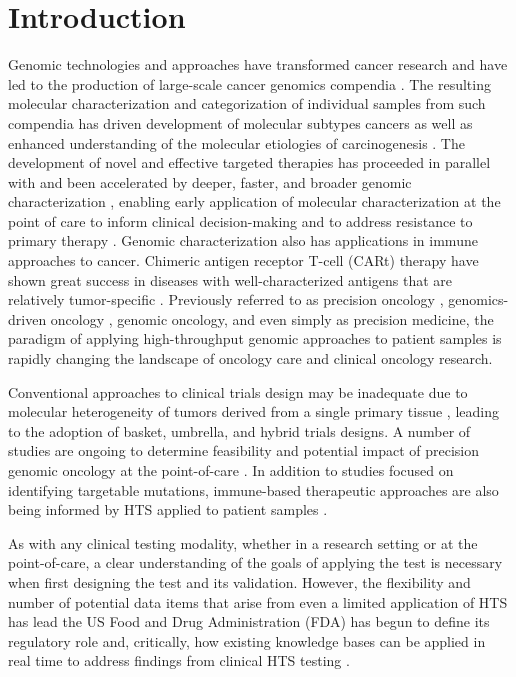 \documentclass[10pt,letterpaper]{article}
\begin{document}
\section{Introduction}
Genomic technologies and approaches have transformed
cancer research and have led to the production of large-scale cancer
genomics compendia
\cite{noauthor_undated-vx,Cancer_Genome_Atlas_Research_Network2013-gt}. The
resulting molecular characterization and categorization of individual
samples from such compendia has driven development of molecular
subtypes cancers as well as enhanced understanding of the molecular
etiologies of carcinogenesis
\cite{Cancer_Genome_Atlas_Network2012-nz,Cancer_Genome_Atlas_Research_Network2015-gd,noauthor_2008-wg}. The
development of novel and effective targeted therapies has proceeded in
parallel with and been accelerated by deeper, faster, and broader
genomic characterization \cite{Blumenthal2016-fb}, enabling early
application of molecular characterization at the point of care to
inform clinical decision-making
\cite{Flaherty2012-dq,Shaw2013-wl,Maemondo2010-dj,Druker2006-qk} and
to address resistance to primary therapy \cite{Ai2014-nf}. Genomic
characterization also has applications in immune approaches to
cancer. Chimeric antigen receptor T-cell (CARt) therapy have shown
great success in diseases with well-characterized antigens that are
relatively tumor-specific \cite{Grupp2013-nd}. Previously referred to
as precision oncology \cite{Sohal2015-bi}, genomics-driven oncology
\cite{Garraway2013-zo}, genomic oncology, and even simply as precision
medicine, the paradigm of applying high-throughput genomic approaches
to patient samples is rapidly changing the landscape of oncology care
and clinical oncology research.

Conventional approaches to clinical trials design may be inadequate
due to molecular heterogeneity of tumors derived from a single primary
tissue \cite{Simon2016-ik}, leading to the adoption of basket,
umbrella, and hybrid trials designs. A number of studies are ongoing
to determine feasibility and potential impact of precision genomic
oncology at the point-of-care
\cite{Cheng2015-wh,noauthor_undated-da,Lopez-Chavez2015-cg}. In
addition to studies focused on identifying targetable mutations,
immune-based therapeutic approaches are also being informed by HTS
applied to patient samples
\cite{Bethune2017-ns,Chalmers2017-ya,Faltas2016-yz}.

As with any clinical testing modality, whether in a research setting
or at the point-of-care, a clear understanding of the goals of
applying the test is necessary when first designing the test and its
validation. However, the flexibility and number of potential data
items that arise from even a limited application of HTS has lead the
US Food and Drug Administration (FDA) has begun to define its
regulatory role \cite{Fda2015-kv} and, critically, how existing
knowledge bases can be applied in real time to address findings from
clinical HTS testing \cite{Fda2016-kx}.
\end{document}
